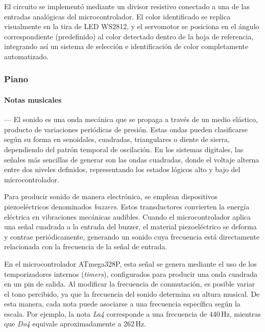     \vspace{1em}

    El circuito se implementó mediante un divisor resistivo conectado a una de las entradas analógicas del microcontrolador. El color identificado se replica visualmente en la tira de LED WS2812, y el servomotor se posiciona en el ángulo correspondiente (predefinido) al color detectado dentro de la hoja de referencia, integrando así un sistema de selección e identificación de color completamente automatizado.

    \vspace{1em}

\subsubsection{\textbf{Piano}}
    \paragraph*{\textbf{Notas musicales}}---
    El sonido es una onda mecánica que se propaga a través de un medio elástico, producto de variaciones periódicas de presión. Estas ondas pueden clasificarse según su forma en senoidales, cuadradas, triangulares o diente de sierra, dependiendo del patrón temporal de oscilación. En los sistemas digitales, las señales más sencillas de generar son las ondas cuadradas, donde el voltaje alterna entre dos niveles definidos, representando los estados lógicos alto y bajo del microcontrolador.

    \vspace{1em}

    Para producir sonido de manera electrónica, se emplean dispositivos piezoeléctricos denominados \textit{buzzers}. Estos transductores convierten la energía eléctrica en vibraciones mecánicas audibles. Cuando el microcontrolador aplica una señal cuadrada a la entrada del buzzer, el material piezoeléctrico se deforma y contrae periódicamente, generando un sonido cuya frecuencia está directamente relacionada con la frecuencia de la señal de entrada.

    \vspace{1em}

    En el microcontrolador ATmega328P, esta señal se genera mediante el uso de los temporizadores internos (\textit{timers}), configurados para producir una onda cuadrada en un pin de salida. Al modificar la frecuencia de conmutación, es posible variar el tono percibido, ya que la frecuencia del sonido determina su altura musical. De esta manera, cada nota puede asociarse a una frecuencia específica según la escala. Por ejemplo, la nota \textit{La4} corresponde a una frecuencia de 440\,Hz, mientras que \textit{Do4} equivale aproximadamente a 262\,Hz.

